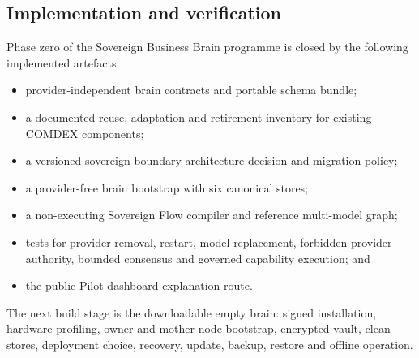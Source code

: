 \subsection{Implementation and verification}

Phase zero of the Sovereign Business Brain programme is closed by the following
implemented artefacts:

\begin{itemize}
  \item provider-independent brain contracts and portable schema bundle;
  \item a documented reuse, adaptation and retirement inventory for existing
  COMDEX components;
  \item a versioned sovereign-boundary architecture decision and migration policy;
  \item a provider-free brain bootstrap with six canonical stores;
  \item a non-executing Sovereign Flow compiler and reference multi-model graph;
  \item tests for provider removal, restart, model replacement, forbidden provider
  authority, bounded consensus and governed capability execution; and
  \item the public Pilot dashboard explanation route.
\end{itemize}

The next build stage is the downloadable empty brain: signed installation,
hardware profiling, owner and mother-node bootstrap, encrypted vault, clean stores,
deployment choice, recovery, update, backup, restore and offline operation.
